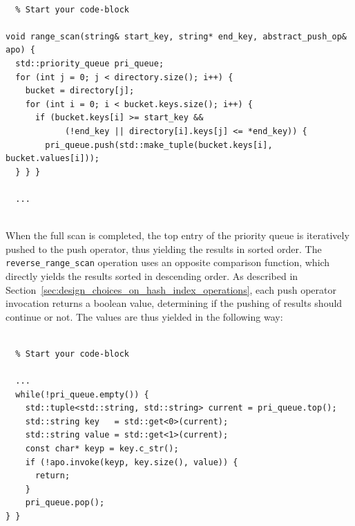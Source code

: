 \documentclass[11pt]{report} %
\begin{document}
\\
\begin{fminipage}{\linewidth}
\begin{lstlisting}  % Start your code-block

void range_scan(string& start_key, string* end_key, abstract_push_op& apo) {
  std::priority_queue pri_queue;
  for (int j = 0; j < directory.size(); i++) {
    bucket = directory[j];
    for (int i = 0; i < bucket.keys.size(); i++) {
      if (bucket.keys[i] >= start_key && 
            (!end_key || directory[i].keys[j] <= *end_key)) {
        pri_queue.push(std::make_tuple(bucket.keys[i], bucket.values[i]));
  } } }

  ...
\end{lstlisting}
\end{fminipage}
\vphantom{fill}\\
When the full scan is completed, the top entry of the priority queue is iteratively pushed to the push operator, thus yielding the results in sorted order. The \verb|reverse_range_scan| operation uses an opposite comparison function, which directly yields the results sorted in descending order. As described in Section~\ref{sec:design_choices_on_hash_index_operations}, each push operator invocation returns a boolean value, determining if the pushing of results should continue or not. The values are thus yielded in the following way:\\
\\
\begin{fminipage}{\linewidth}
\begin{lstlisting}  % Start your code-block

  ...
  while(!pri_queue.empty()) {
    std::tuple<std::string, std::string> current = pri_queue.top();
    std::string key   = std::get<0>(current);
    std::string value = std::get<1>(current);
    const char* keyp = key.c_str();
    if (!apo.invoke(keyp, key.size(), value)) {
      return;
    }
    pri_queue.pop();
} }
\end{lstlisting}
\end{fminipage}
\end{document}
